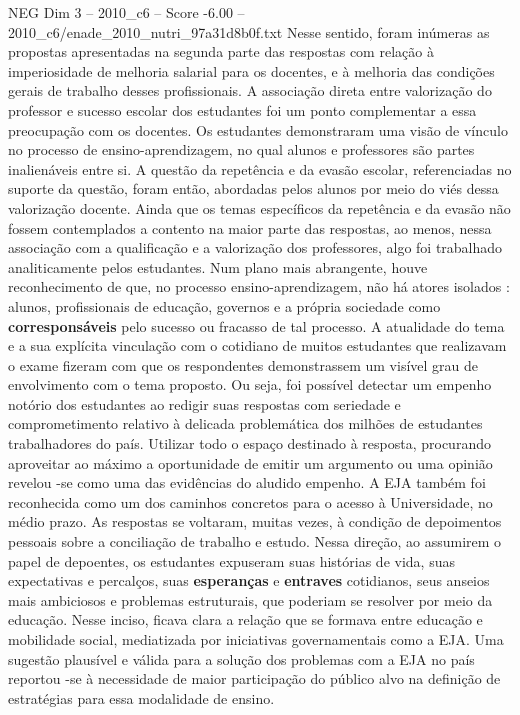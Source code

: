 \begin{textsample}{NEG Dim 3 – 2010\_c6 – Score -6.00 – 2010\_c6/enade\_2010\_nutri\_97a31d8b0f.txt}
Nesse sentido, foram inúmeras as propostas apresentadas na segunda parte das respostas com relação à imperiosidade de melhoria salarial para os docentes, e à melhoria das condições gerais de trabalho desses profissionais.
A associação direta entre valorização do professor e sucesso escolar dos estudantes foi um ponto complementar a essa preocupação com os docentes.
Os estudantes demonstraram uma visão de vínculo no processo de ensino-aprendizagem, no qual alunos e professores são partes inalienáveis entre si.
A questão da repetência e da evasão escolar, referenciadas no suporte da questão, foram então, abordadas pelos alunos por meio do viés dessa valorização docente.
Ainda que os temas específicos da repetência e da evasão não fossem contemplados a contento na maior parte das respostas, ao menos, nessa associação com a qualificação e a valorização dos professores, algo foi trabalhado analiticamente pelos estudantes.
Num plano mais abrangente, houve reconhecimento de que, no processo ensino-aprendizagem, não há atores isolados : alunos, profissionais de educação, governos e a própria sociedade como \textbf{corresponsáveis} pelo sucesso ou fracasso de tal processo.
A atualidade do tema e a sua explícita vinculação com o cotidiano de muitos estudantes que realizavam o exame fizeram com que os respondentes demonstrassem um visível grau de envolvimento com o tema proposto.
Ou seja, foi possível detectar um empenho notório dos estudantes ao redigir suas respostas com seriedade e comprometimento relativo à delicada problemática dos milhões de estudantes trabalhadores do país.
Utilizar todo o espaço destinado à resposta, procurando aproveitar ao máximo a oportunidade de emitir um argumento ou uma opinião revelou -se como uma das evidências do aludido empenho.
A EJA também foi reconhecida como um dos caminhos concretos para o acesso à Universidade, no médio prazo.
As respostas se voltaram, muitas vezes, à condição de depoimentos pessoais sobre a conciliação de trabalho e estudo.
Nessa direção, ao assumirem o papel de depoentes, os estudantes expuseram suas histórias de vida, suas expectativas e percalços, suas \textbf{esperanças} e \textbf{entraves} cotidianos, seus anseios mais ambiciosos e problemas estruturais, que poderiam se resolver por meio da educação.
Nesse inciso, ficava clara a relação que se formava entre educação e mobilidade social, mediatizada por iniciativas governamentais como a EJA.
Uma sugestão plausível e válida para a solução dos problemas com a EJA no país reportou -se à necessidade de maior participação do público alvo na definição de estratégias para essa modalidade de ensino.

\end{textsample}

